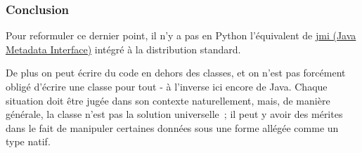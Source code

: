     \hypertarget{conclusion}{%
\subsubsection{Conclusion}\label{conclusion}}

    Pour reformuler ce dernier point, il n'y a pas en Python l'équivalent de
\href{https://en.wikipedia.org/wiki/Java_Metadata_Interface}{jmi (Java
Metadata Interface)} intégré à la distribution standard.

De plus on peut écrire du code en dehors des classes, et on n'est pas
forcément obligé d'écrire une classe pour tout - à l'inverse ici encore
de Java. Chaque situation doit être jugée dans son contexte
naturellement, mais, de manière générale, la classe n'est pas la
solution universelle~; il peut y avoir des mérites dans le fait de
manipuler certaines données sous une forme allégée comme un type natif.


    
    
    
